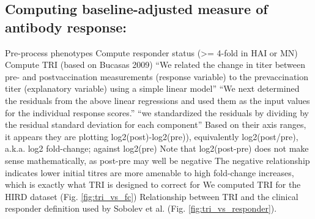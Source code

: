 \subsection{Computing baseline-adjusted measure of antibody response: }

\begin{outline}
\1 Pre-process phenotypes
    \2 Compute responder status (>= 4-fold in HAI or MN)
    \2 Compute TRI (based on Bucasas 2009)
        \3 “We related the change in titer between pre- and postvaccination measurements (response variable) to the prevaccination titer (explanatory variable) using a simple linear model”
        \3 “We next determined the residuals from the above linear regressions and used them as the input values for the individual response scores.”
        \3 “we standardized the residuals by dividing by the residual standard deviation for each component”
            \4 Based on their axis ranges, it appears they are plotting log2(post)-log2(pre)), equivalently log2(post/pre), a.k.a. log2 fold-change; against log2(pre)
            \4 Note that log2(post-pre) does not make sense mathematically, as post-pre may well be negative
            \4 The negative relationship indicates lower initial titres are more amenable to high fold-change increases, which is exactly what TRI is designed to correct for
\1 We computed TRI for the HIRD dataset (Fig. \ref{fig:tri_vs_fc})
\1 Relationship between TRI and the clinical responder definition used by Sobolev et al. (Fig. \ref{fig:tri_vs_responder}).
\end{outline}

